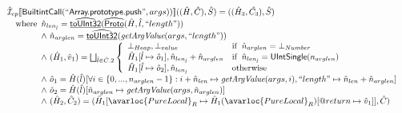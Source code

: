 \[\begin{array}{ll}
\aI _{cp}\lbr \SF{BuiltintCall}(``\SF{Array.prototype.push}",args))\rbr((\hat{H},\hat{C}), \hat{S})
  = ((\hat{H}_3, \hat{C_3}), \hat{S})\\
\quad\wherec{
  \hat{n}_{len_{\hat{l}}} = \ahf{toUInt32}(\ahf{Proto}(\hat{H}, \hat{l}, ``length"))\\
  \land\ \hat{n}_{arglen} = \ahf{toUInt32}(\hf{getArgValue}(args, ``length"))\\
  \land\ (\hat{H}_1, \hat{v}_1) =  \bigsqcup_{\hat{l} \in \hat{C}.2} \left\{\begin{array}{ll}
      \bot_{Heap}, \bot_{value} & \ifc{\hat{n}_{arglen} = \bot_{Number}}\\
      \hat{H}_1[\hat{l} \mapsto \hat{o}_1], \hat{n}_{len_{\hat{l}}} + \hat{n}_{arglen}  & \ifc{\hat{n}_{len_{\hat{l}}} = \SF{UIntSingle}(n_{arglen})}\\
      \hat{H}_1[\hat{l} \mapsto \hat{o}_2], \hat{n}_{len_{\hat{l}}}& \owc
    \end{array}\right.\\
  \land\ \hat{o}_1 = \hat{H}(\hat{l})[\forall i \in \{0,..., n_{arglen}-1\}: i + \hat{n}_{len} \mapsto \hf{getArgValue}(args, i), ``length" \mapsto \hat{n}_{len} + \hat{n}_{arglen}]\\
  \land\ \hat{o}_2 = \hat{H}(\hat{l})[\hat{n}_{arglen} 
    \mapsto \hf{getArgValue}(args, \hat{n}_{arglen})]\\
  \land\ (\hat{H}_2, \hat{C}_2) = 
      (\hat{H}_1[\avarloc{PureLocal}_R \mapsto \hat{H}_1(\avarloc{PureLocal}_R)[\varprop{return} \mapsto \hat{v}_1]], \hat{C})\\
  }\\
\\\\




\end{array}\]
